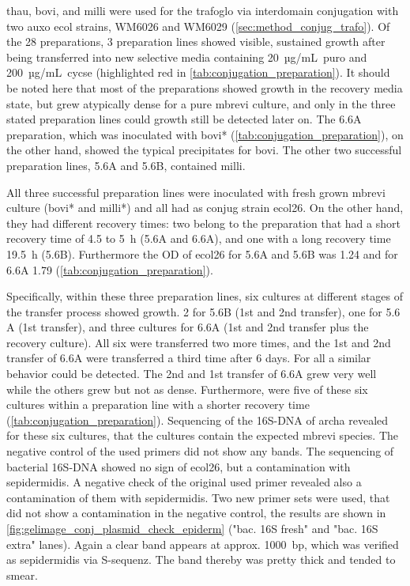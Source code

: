\acrshort{thau}, \acrshort{bovi}, and \acrshort{milli} were used for the \gls{trafoglo} via interdomain conjugation with two \gls{auxo} \acrshort{ecol} strains, WM6026 and WM6029 (\cref{sec:method_conjug_trafo}).
Of the 28 preparations, 3 preparation lines showed visible, sustained growth after being transferred into new selective media containing 20~µg/mL~\acrshort{puro} and 200~µg/mL~\acrshort{cycse} (highlighted red in \cref{tab:conjugation_preparation}). It should be noted here that most of the preparations showed growth in the recovery media state, but grew atypically dense for a pure \acrlong{mbrevi} culture, and only in the three stated preparation lines could growth still be detected later on. The 6.6A preparation, which was inoculated with \acrshort{bovi}* (\cref{tab:conjugation_preparation}), on the other hand, showed the typical precipitates for \acrshort{bovi}. The other two successful preparation lines, 5.6A and 5.6B, contained \acrshort{milli}.

All three successful preparation lines were inoculated with fresh grown \acrlong{mbrevi} culture (\acrshort{bovi}* and \acrshort{milli}*) and all had as \gls{conjug} strain \acrshort{ecol26}. On the other hand, they had different recovery times: two belong to the preparation that had a short recovery time of 4.5 to 5~h (5.6A and 6.6A), and one with a long recovery time 19.5~h (5.6B). Furthermore the \acrshort{OD} of \acrshort{ecol26} for 5.6A and 5.6B was 1.24 and for 6.6A 1.79 (\cref{tab:conjugation_preparation}).

Specifically, within these three preparation lines, six cultures at different stages of the transfer process showed growth. 2 for 5.6B (1st and 2nd transfer), one for 5.6 A (1st transfer), and three cultures for  6.6A (1st and 2nd transfer plus the recovery culture). All six were transferred two more times, and the 1st and 2nd transfer of 6.6A were transferred a third time after 6 days.
For all a similar behavior could be detected. The 2nd and 1st transfer of 6.6A grew very well while the others grew but not as dense. Furthermore, were five of these six cultures within a preparation line with a shorter recovery time (\cref{tab:conjugation_preparation}).
Sequencing of the 16S-DNA of \gls{archa} revealed for these six cultures, that the cultures contain the expected \acrlong{mbrevi} species. The negative control of the used primers did not show any bands. 
The sequencing of bacterial 16S-DNA showed no sign of \acrshort{ecol26}, but a contamination with \acrfull{sepidermidis}. A negative check of the original used \gls{primer} revealed also a contamination of them with \acrshort{sepidermidis}. Two new primer sets were used, that did not show a contamination in the negative control, the results are shown in \cref{fig:gelimage_conj_plasmid_check_epiderm} ("bac. 16S fresh" and "bac. 16S extra" lanes). Again a clear band appears at approx. 1000~\acrshort{bp}, which was verified as \acrshort{sepidermidis} via \gls{S-sequenz}. The band thereby was pretty thick and tended to smear.


